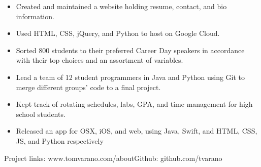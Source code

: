 \documentclass[11pt]{article}
\begin{document}
\vspace{1mm}
{\fontsize{10}{12}\robotocondlight
\begin{itemize}[noitemsep,nolistsep]
    \item Created and maintained a website holding resume, contact, and bio information.
    \item Used {\robotocond HTML}, {\robotocond CSS}, {\robotocond jQuery}, and {\robotocond Python} to host on {\robotocond Google Cloud}.
\end{itemize}
\begin{itemize}[noitemsep,nolistsep]
    \item Sorted 800 students to their preferred Career Day speakers in accordance with their top choices and an assortment of variables.
    \item Lead a team of 12 student programmers in {\robotocond Java} and {\robotocond Python} using {\robotocond Git} to merge different groups’ code to a final project.
\end{itemize}
\begin{itemize}[noitemsep,nolistsep]
    \item Kept track of rotating schedules, labs, GPA, and time management for high school students. 
    \item Released an app for OSX, iOS, and web, using {\robotocond Java}, {\robotocond Swift},
     and {\robotocond HTML}, {\robotocond CSS}, {\robotocond JS}, and {\robotocond Python} respectively
\end{itemize}
{\fontsize{8}{10}\robotocondlight Project links: www.tomvarano.com/about\hfill Github: github.com/tvarano}
}
\vspace{-5mm}
\hsep
\vspace{-3mm}
\end{document}
